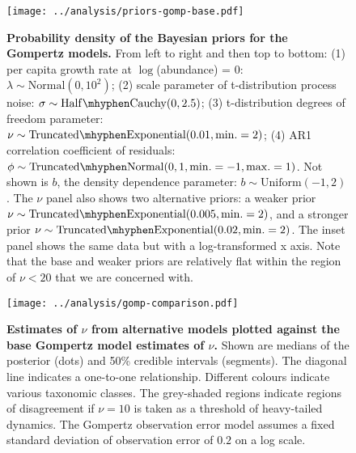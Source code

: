 \begin{figure}[htbp]
\begin{center}
\texttt{[image: ../analysis/priors-gomp-base.pdf]}

\caption{\textbf{Probability density of the Bayesian priors for the Gompertz models.} From left to right and then top to bottom: (1) per capita growth rate at $\log$(abundance) = $0$: $\lambda \sim \mathrm{Normal}(0, 10^2)$; (2) scale parameter of t-distribution process noise: $\sigma \sim \mathrm{Half\mhyphen Cauchy} (0, 2.5)$; (3) t-distribution degrees of freedom parameter: $\nu \sim \mathrm{Truncated\mhyphen Exponential}(0.01, \mathrm{min.} = 2)$; (4) AR1 correlation coefficient of residuals: $\phi \sim \mathrm{Truncated \mhyphen Normal}(0, 1, \mathrm{min.} = -1, \mathrm{max.} = 1)$. Not shown is $b$, the density dependence parameter: $b \sim \mathrm{Uniform}(-1, 2)$. The $\nu$ panel also shows two alternative priors: a weaker prior $\nu \sim \mathrm{Truncated\mhyphen Exponential}(0.005, \mathrm{min.} = 2)$, and a stronger prior $\nu \sim \mathrm{Truncated\mhyphen Exponential}(0.02, \mathrm{min.} = 2)$. The inset panel shows the same data but with a log-transformed x axis. Note that the base and weaker priors are relatively flat within the region of $\nu < 20$ that we are concerned with. }

\label{fig:priors}
\end{center}
\end{figure}

\clearpage

\begin{figure}[htbp]
\begin{center}
\texttt{[image: ../analysis/gomp-comparison.pdf]}

\caption{\textbf{Estimates of $\nu$ from alternative models plotted against the base Gompertz model estimates of $\nu$.} Shown are medians of the posterior (dots) and 50\% credible intervals (segments). The diagonal line indicates a one-to-one relationship. Different colours indicate various taxonomic classes. The grey-shaded regions indicate regions of disagreement if $\nu = 10$ is taken as a threshold of heavy-tailed dynamics. The Gompertz observation error model assumes a fixed standard deviation of observation error of $0.2$ on a log scale.}

\label{fig:alt}
\end{center}
\end{figure}

\clearpage

